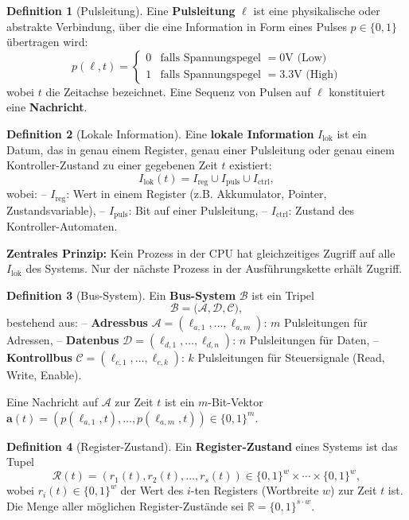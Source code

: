 \documentclass[a4paper,12pt]{article}
\theoremstyle{definition}
\newtheorem{definition}{Definition}
\begin{document}
	\begin{definition}[Pulsleitung]
		Eine \textbf{Pulsleitung} $\ell$ ist eine physikalische oder abstrakte Verbindung, über die eine Information in Form eines Pulses $p \in \{0, 1\}$ übertragen wird:
		\[
		p(\ell, t) = \begin{cases}
			0 & \text{falls Spannungspegel } = 0\text{V (Low)} \\
			1 & \text{falls Spannungspegel } = 3.3\text{V (High)}
		\end{cases}
		\]
		wobei $t$ die Zeitachse bezeichnet. Eine Sequenz von Pulsen auf $\ell$ konstituiert eine \textbf{Nachricht}.
	\end{definition}
	
	\begin{definition}[Lokale Information]
		Eine \textbf{lokale Information} $I_{\text{lok}}$ ist ein Datum, das in genau einem Register, genau einer Pulsleitung oder genau einem Kontroller-Zustand zu einer gegebenen Zeit $t$ existiert:
		\[
		I_{\text{lok}}(t) = I_{\text{reg}} \cup I_{\text{puls}} \cup I_{\text{ctrl}},
		\]
		wobei:
		-- $I_{\text{reg}}$: Wert in einem Register (z.B. Akkumulator, Pointer, Zustandsvariable),
		-- $I_{\text{puls}}$: Bit auf einer Pulsleitung,
		-- $I_{\text{ctrl}}$: Zustand des Kontroller-Automaten.
		
		\textbf{Zentrales Prinzip:} Kein Prozess in der CPU hat gleichzeitiges Zugriff auf alle $I_{\text{lok}}$ des Systems. Nur der nächste Prozess in der Ausführungskette erhält Zugriff.
	\end{definition}
	
	\begin{definition}[Bus-System]
		Ein \textbf{Bus-System} $\mathcal{B}$ ist ein Tripel
		\[
		\mathcal{B} = \bigl(\mathcal{A}, \mathcal{D}, \mathcal{C}\bigr),
		\]
		bestehend aus:
		-- \textbf{Adressbus} $\mathcal{A} = (\ell_{a,1}, \ldots, \ell_{a,m})$: $m$ Pulsleitungen für Adressen,
		-- \textbf{Datenbus} $\mathcal{D} = (\ell_{d,1}, \ldots, \ell_{d,n})$: $n$ Pulsleitungen für Daten,
		-- \textbf{Kontrollbus} $\mathcal{C} = (\ell_{c,1}, \ldots, \ell_{c,k})$: $k$ Pulsleitungen für Steuersignale (Read, Write, Enable).
		
		Eine Nachricht auf $\mathcal{A}$ zur Zeit $t$ ist ein $m$-Bit-Vektor $\mathbf{a}(t) = (p(\ell_{a,1}, t), \ldots, p(\ell_{a,m}, t)) \in \{0,1\}^m$.
	\end{definition}
	
	\begin{definition}[Register-Zustand]
		Ein \textbf{Register-Zustand} eines Systems ist das Tupel
		\[
		\mathcal{R}(t) = (r_1(t), r_2(t), \ldots, r_s(t)) \in \{0,1\}^{w} \times \cdots \times \{0,1\}^{w},
		\]
		wobei $r_i(t) \in \{0,1\}^{w}$ der Wert des $i$-ten Registers (Wortbreite $w$) zur Zeit $t$ ist. Die Menge aller möglichen Register-Zustände sei $\mathbb{R} = \{0,1\}^{s \cdot w}$.
	\end{definition}
	
\end{document}

